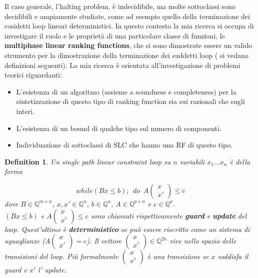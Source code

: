 \documentclass[a4paper]{article}
\newtheorem{mydef}{Definition}
\begin{document}
  Il caso generale, l'halting problem, è indecidibile, ma molte sottoclassi
  sono decidibili e ampiamente studiate, come ad esempio quello della
  terminazione dei cosidetti loop lineari deterministici. In questo contesto la mia ricerca si occupa di
  investigare il ruolo e le proprietà di una particolare classe di funzioni, le
  \textbf{multiphase linear ranking functions}, che si sono dimostrate essere un
  valido strumento per la dimostrazione della terminazione dei suddetti loop (
  si vedano definizioni seguenti). La mia ricerca è orientata all'investigazione di
  problemi teorici riguardanti:
  \begin{itemize}
    \item L'esistenza di un algoritmo (assieme a soundness e completeness) per
    la sintetizzazione di questo tipo di ranking function sia sui razionali che sugli interi.
    \item L'esistenza di un bound di qualche tipo sul numero di componenti.
    \item Individuazione di sottoclassi di SLC che hanno una RF di questo tipo.
    \end{itemize}
    
  

\begin{mydef}
Un single path linear constraint loop  su $n$ variabili $x_1 \ldots x_n$ \`e
della forma

\[
while (Bx \leq b); \:\: do \: \;A \begin{pmatrix}x\\x'\end{pmatrix} \leq c
\] 
dove $B \in \mathbb{Q}^{m \times n}$, $x,x' \in \mathbb{Q}^n$, $b \in
\mathbb{Q}^n$, $A \in \mathbb{Q}^{p \times n}$ e $c \in
\mathbb{Q}^p$. \\ $(Bx \leq b)$ e $A \begin{pmatrix}x\\x'\end{pmatrix} \leq c$
sono chiamati rispettivamente \textbf{guard} e \textbf{update} del loop.
Quest'ultimo è \textbf{deterministico} se pu\`o essere riscritto come un sistema
di uguaglianze ($A \begin{pmatrix}x\\x'\end{pmatrix} = c$).
Il vettore $\begin{pmatrix}x\\x'\end{pmatrix} \in \mathbb{Q}^{2n}$ vive nello
spazio delle transizioni del loop. Pi\`u formalmente 
$\begin{pmatrix}x\\x'\end{pmatrix}$ è una transizione se $x$  soddisfa il guard 
e $x'$ l' update.
\end{mydef}
\end{document}
